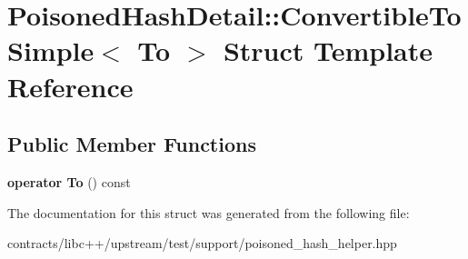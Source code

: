 \hypertarget{struct_poisoned_hash_detail_1_1_convertible_to_simple}{}\section{Poisoned\+Hash\+Detail\+:\+:Convertible\+To\+Simple$<$ To $>$ Struct Template Reference}
\label{struct_poisoned_hash_detail_1_1_convertible_to_simple}
\subsection*{Public Member Functions}
\begin{DoxyCompactItemize}
\item 
\mbox{\label{struct_poisoned_hash_detail_1_1_convertible_to_simple_a290551d24a6661bdd61c56406a5351c1}} 
{\bfseries operator To} () const
\end{DoxyCompactItemize}


The documentation for this struct was generated from the following file\+:\begin{DoxyCompactItemize}
\item 
contracts/libc++/upstream/test/support/poisoned\+\_\+hash\+\_\+helper.\+hpp\end{DoxyCompactItemize}
